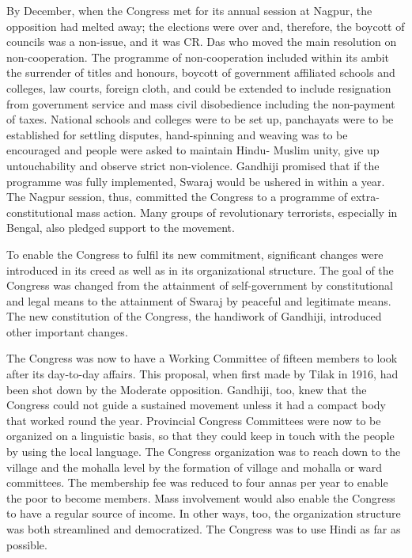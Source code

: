 By December, when the Congress met for its annual session at Nagpur, the opposition had melted away; the elections were over and, therefore, the boycott of councils was a non-issue, and it was CR. Das who moved the main resolution on non-cooperation. The programme of non-cooperation included within its ambit the surrender of titles and honours, boycott of government affiliated schools and colleges, law courts, foreign cloth, and could be extended to include resignation from government service and mass civil disobedience including the non-payment of taxes. National schools and colleges were to be set up, panchayats were to be established for settling disputes, hand-spinning and weaving was to be encouraged and people were asked to maintain Hindu- Muslim unity, give up untouchability and observe strict non-violence. Gandhiji promised that if the programme was fully implemented, Swaraj would be ushered in within a year. The Nagpur session, thus, committed the Congress to a programme of extra-constitutional mass action. Many groups of revolutionary terrorists, especially in Bengal, also pledged support to the movement. 

To enable the Congress to fulfil its new commitment, significant changes were introduced in its creed as well as in its organizational structure. The goal of the Congress was changed from the attainment of self-government by constitutional and legal means to the attainment of Swaraj by peaceful and legitimate means. The new constitution of the Congress, the handiwork of Gandhiji, introduced other important changes. 

The Congress was now to have a Working Committee of fifteen members to look after its day-to-day affairs. This proposal, when first made by Tilak in 1916, had been shot down by the Moderate opposition. Gandhiji, too, knew that the Congress could not guide a sustained movement unless it had a compact body that worked round the year. Provincial Congress Committees were now to be organized on a linguistic basis, so that they could keep in touch with the people by using the local language. The Congress organization was to reach down to the village and the mohalla level by the formation of village and mohalla or ward committees. The membership fee was reduced to four annas per year to enable the poor to become members. Mass involvement would also enable the Congress to have a regular source of income. In other ways, too, the organization structure was both streamlined and democratized. The Congress was to use Hindi as far as possible.

